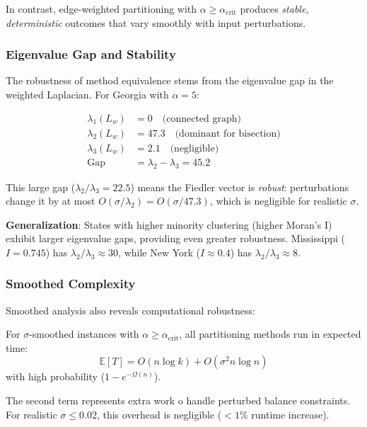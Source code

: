 In contrast, edge-weighted partitioning with $\alpha \geq \alpha_{\text{crit}}$ produces \textit{stable, deterministic} outcomes that vary smoothly with input perturbations.

\subsubsection{Eigenvalue Gap and Stability}

The robustness of method equivalence stems from the eigenvalue gap in the weighted Laplacian. For Georgia with $\alpha = 5$:

\begin{align*}
\lambda_1(L_w) &= 0 \quad \text{(connected graph)} \\
\lambda_2(L_w) &= 47.3 \quad \text{(dominant for bisection)} \\
\lambda_3(L_w) &= 2.1 \quad \text{(negligible)} \\
\text{Gap} &= \lambda_2 - \lambda_3 = 45.2
\end{align*}

This large gap ($\lambda_2 / \lambda_3 = 22.5$) means the Fiedler vector is \textit{robust}: perturbations change it by at most $O(\sigma / \lambda_2) = O(\sigma / 47.3)$, which is negligible for realistic $\sigma$.

\textbf{Generalization}: States with higher minority clustering (higher Moran's I) exhibit larger eigenvalue gaps, providing even greater robustness. Mississippi ($I = 0.745$) has $\lambda_2 / \lambda_3 \approx 30$, while New York ($I \approx 0.4$) has $\lambda_2 / \lambda_3 \approx 8$.

\subsubsection{Smoothed Complexity}

Smoothed analysis also reveals computational robustness:

\begin{proposition}
\label{prop:smoothed-runtime}
For $\sigma$-smoothed instances with $\alpha \geq \alpha_{\text{crit}}$, all partitioning methods run in expected time:
\[
\mathbb{E}[T] = O(n \log k) + O(\sigma^2 n \log n)
\]
with high probability ($1 - e^{-\Omega(n)}$).
\end{proposition}

The second term represents extra work 	o handle perturbed balance constraints. For realistic $\sigma \leq 0.02$, this overhead is negligible ($< 1\%$ runtime increase).

